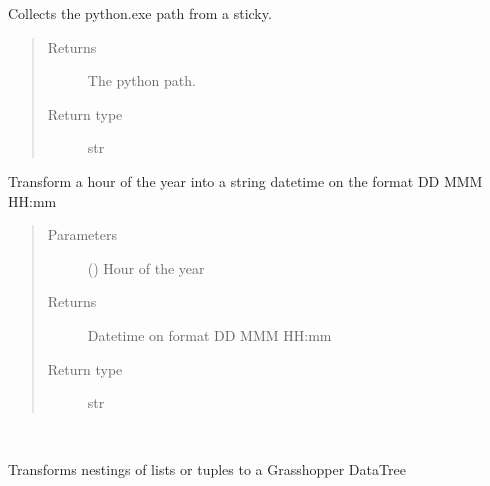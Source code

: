 \documentclass[letterpaper,10pt,english]{sphinxmanual}
\begin{document}

\begin{fulllineitems}
\label{\detokenize{lib:livestock.lib.misc.get_python_exe}}
Collects the python.exe path from a sticky.
\begin{quote}\begin{description}
\item[{Returns}] \leavevmode
The python path.

\item[{Return type}] \leavevmode
str

\end{description}\end{quote}

\end{fulllineitems}


\begin{fulllineitems}
\label{\detokenize{lib:livestock.lib.misc.hour_to_date}}
Transform a hour of the year into a string datetime on the format DD MMM HH:mm
\begin{quote}\begin{description}
\item[{Parameters}] \leavevmode
{} () \textendash{} Hour of the year

\item[{Returns}] \leavevmode
Datetime on format DD MMM HH:mm

\item[{Return type}] \leavevmode
str

\end{description}\end{quote}

\end{fulllineitems}


\begin{fulllineitems}
\label{\detokenize{lib:livestock.lib.misc.list_to_tree}}~
\begin{DUlineblock}{0em}
\item[] Transforms nestings of lists or tuples to a Grasshopper DataTree
\item[] 
\end{DUlineblock}

\end{fulllineitems}
\end{document}
